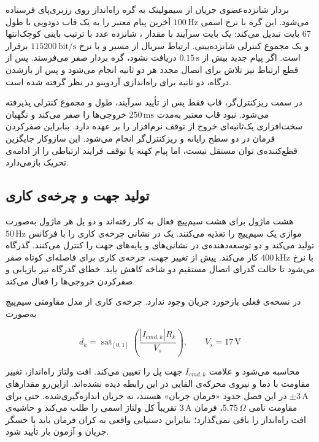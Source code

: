 بردار شانزده‌عضوی جریان از سیمولینک به گره راه‌انداز روی رزبری‌پای فرستاده می‌شود. این گره با نرخ اسمی $100\,\mathrm{Hz}$ آخرین پیام معتبر را به یک قاب دودویی با طول 67 بایت تبدیل می‌کند: یک بایت سرآیند با مقدار ، شانزده عدد  با ترتیب بایتی کوچک‌انتها و یک مجموع کنترلی شانزده‌بیتی. ارتباط سریال از مسیر  و با نرخ $115200\,\mathrm{bit/s}$ برقرار است. اگر پیام جدید بیش از $0.15\,\mathrm s$ دریافت نشود، گره بردار صفر می‌فرستد. پس از قطع ارتباط نیز تلاش برای اتصال مجدد هر دو ثانیه انجام می‌شود و پس از بازشدن درگاه، دو ثانیه برای راه‌اندازی آردوینو در نظر گرفته شده است.

در سمت ریزکنترل‌گر، قاب فقط پس از تأیید سرآیند، طول و مجموع کنترلی پذیرفته می‌شود. نبود قاب معتبر به‌مدت $250\,\mathrm{ms}$ خروجی‌ها را صفر می‌کند و نگهبان سخت‌افزاری یک‌ثانیه‌ای خروج از توقف نرم‌افزار را بر عهده دارد. بنابراین صفرکردن فرمان در دو سطح رایانه و ریزکنترل‌گر انجام می‌شود. این سازوکار جایگزین قطع‌کننده‌ی توان مستقل نیست، اما پیام کهنه یا توقف فرایند ارتباطی را از ادامه‌ی تحریک بازمی‌دارد.

\subsection{تولید جهت و چرخه‌ی کاری}

هشت ماژول  برای هشت سیم‌پیچ فعال به کار رفته‌اند و دو پل هر ماژول به‌صورت موازی یک سیم‌پیچ را تغذیه می‌کنند. یک  در نشانی  چرخه‌ی کاری را با فرکانس $50\,\mathrm{Hz}$ تولید می‌کند و دو توسعه‌دهنده‌ی  در نشانی‌های  و  پایه‌های جهت را کنترل می‌کنند. گذرگاه  با نرخ $400\,\mathrm{kHz}$ کار می‌کند. پیش از تغییر جهت، چرخه‌ی کاری برای فاصله‌ای کوتاه صفر می‌شود تا حالت گذرای اتصال مستقیم دو شاخه کاهش یابد. خطای گذرگاه نیز بازیابی و صفرکردن خروجی‌ها را فعال می‌کند.

در نسخه‌ی فعلی بازخورد جریان وجود ندارد. چرخه‌ی کاری از مدل مقاومتی سیم‌پیچ به‌صورت

\begin{equation}
	d_k=\operatorname{sat}_{[0,1]}
	\left(\frac{|I_{cmd,k}|R_k}{V_s}\right),
	\qquad V_s=17\,\mathrm V
	\label{eq:method-open-loop-current-duty}
\end{equation}

محاسبه می‌شود و علامت $I_{cmd,k}$ جهت پل را تعیین می‌کند. افت ولتاژ راه‌انداز، تغییر مقاومت با دما و نیروی محرکه‌ی القایی در این رابطه دیده نشده‌اند. ازاین‌رو مقدارهای $±3\,\mathrm A$ در این فصل حدود «فرمان جریان» هستند، نه جریان اندازه‌گیری‌شده. حتی برای مقاومت نامی $5.75\,\Omega$، فرمان $3\,\mathrm A$ تقریباً کل ولتاژ اسمی را طلب می‌کند و حاشیه‌ی افت راه‌انداز را باقی نمی‌گذارد؛ بنابراین دستیابی واقعی به کران فرمان باید با حسگر جریان و آزمون بار تأیید شود.

